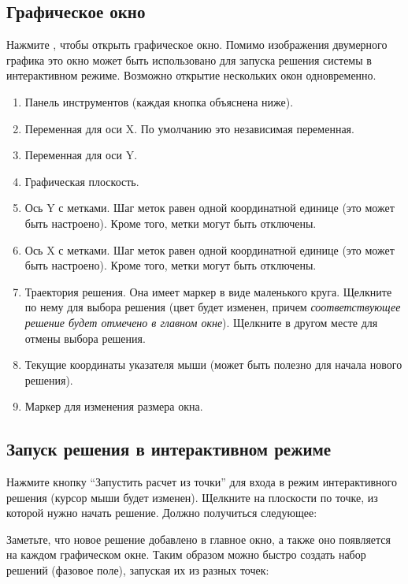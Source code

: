 \documentclass[12pt]{article}
\begin{document}
\subsection{Графическое окно}

Нажмите , чтобы открыть графическое окно.
Помимо изображения двумерного графика это окно может быть 
использовано для запуска решения системы
в интерактивном режиме. Возможно открытие нескольких окон одновременно.


\begin{enumerate}
\item Панель инструментов (каждая кнопка объяснена ниже).
\item Переменная для оси X. По умолчанию это независимая переменная.
\item Переменная для оси Y.
\item Графическая плоскость.
\item Ось Y с метками. Шаг меток равен одной координатной единице (это может быть настроено). 
Кроме того, метки могут быть отключены.
\item Ось X с метками. Шаг меток равен одной координатной единице (это может быть настроено). 
Кроме того, метки могут быть отключены.
\item Траектория решения. Она имеет маркер в виде маленького круга.
Щелкните по нему для выбора решения (цвет будет изменен, причем \textit{соответствующее решение
будет отмечено в главном окне}). Щелкните в другом месте для отмены выбора решения.
\item Текущие координаты указателя мыши (может быть полезно для начала нового решения).
\item Маркер для изменения размера окна.
\end{enumerate}

\subsection{Запуск решения в интерактивном режиме}
Нажмите кнопку ``Запустить расчет из точки''  
для входа в режим интерактивного решения (курсор мыши будет изменен).
Щелкните на плоскости по точке, из которой нужно начать решение.
Должно получиться следующее:


Заметьте, что новое решение добавлено в главное окно, а также оно появляется на каждом графическом окне.
Таким образом можно быстро создать набор решений (фазовое поле), запуская их из разных точек:
\end{document}
